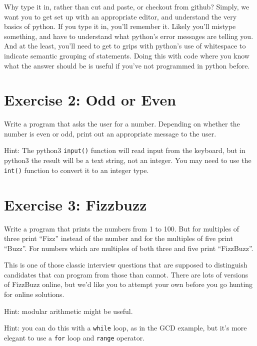 \documentclass{article}
\begin{document}
\vspace{0.1in} Why type it in, rather than cut and paste, or checkout
from github?  Simply, we want you to get set up with an appropriate
editor, and understand the very basics of python. If you type it in,
you'll remember it.  Likely you'll mistype something, and have to
understand what python's error messages are telling you.  And at the
least, you'll need to get to grips with python's use of whitespace to
indicate semantic grouping of statements.  Doing this with code where
you know what the answer should be is useful if you've not programmed
in python before.

\section*{Exercise 2: Odd or Even}

Write a program that asks the user for a number. Depending on whether
the number is even or odd, print out an appropriate message to the
user.

\vspace{0.1in}\noindent Hint: The python3 \texttt{input()} function will read input from the keyboard,
but in python3 the result will be a text string, not an integer.  You
may need to use the \texttt{int()} function to convert it to an integer type.

\section*{Exercise 3: Fizzbuzz}

Write a program that prints the numbers from 1 to 100. But for
multiples of three print ``Fizz'' instead of the number and for the
multiples of five print ``Buzz''. For numbers which are multiples of
both three and five print ``FizzBuzz''.

This is one of those classic interview questions that are supposed to
distinguish candidates that can program from those than cannot.  There
are lots of versions of FizzBuzz online, but we'd like you to attempt
your own before you go hunting for online solutions.

\vspace{0.1in}\noindent Hint: modular arithmetic might be useful.

\vspace{0.1in}\noindent Hint: you can do this with a \texttt{while} loop, as in the GCD example, but it's
more elegant to use a \texttt{for} loop and \texttt{range} operator.
\end{document}
